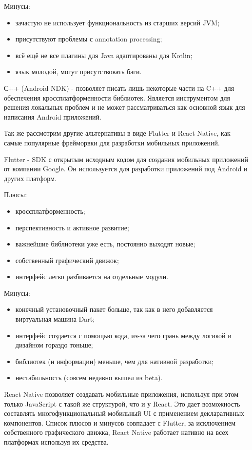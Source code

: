Минусы:
\begin{itemize}
 \item зачастую не использует функциональность из старших версий JVM;
 \item присутствуют проблемы с annotation processing;
 \item всё ещё не все плагины для Java адаптированы для Kotlin;
 \item язык молодой, могут присутствовать баги.
\end{itemize}

С++ (Android NDK) - позволяет писать лишь некоторые части на C++ для обеспечения кроссплатформенности библиотек. Является инструментом для решения локальных проблем и не может рассматриваться как основной язык для написания Android приложений\cite{web12}.

Так же рассмотрим другие альтернативы в виде Flutter и React Native, как самые популярные фрейморвки для разработки мобильных приложений.

Flutter - SDK с открытым исходным кодом для создания мобильных приложений от компании Google. Он используется для разработки приложений под Android и других платформ.

Плюсы:
\begin{itemize}
 \item кроссплатформенность;
 \item перспективность и активное развитие;
 \item важнейшие библиотеки уже есть, постоянно выходят новые;
 \item собственный графический движок;
 \item интерфейс легко разбивается на отдельные модули.
\end{itemize}

Минусы:
\begin{itemize}
 \item конечный установочный пакет больше, так как в него добавляется виртуальная машина Dart;
 \item интерфейс создается с помощью кода, из-за чего грань между логикой и дизайном гораздо тоньше;
 \item библиотек (и информации) меньше, чем для нативной разработки;
 \item нестабильность (совсем недавно вышел из beta).
\end{itemize}


React Native позволяет создавать мобильные приложения, используя при этом только JavaScript с такой же структурой, что и у React. Это дает возможность составлять многофункциональный мобильный UI с применением декларативных компонентов. Список плюсов и минусов совпадает с Flutter, за исключением собственного графического движка, React Native работает нативно на всех платформах используя их средства.

